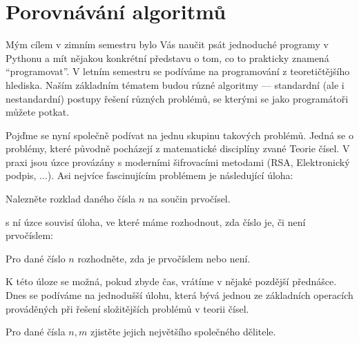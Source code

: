 \ifx\ucebnice\undefined

\setcounter{section}{0}
\else
\renewcommand{\section}[1]{\chapter{#1}}
\fi
\section{Porovnávání algoritmů}

Mým cílem v zimním semestru bylo Vás naučit psát jednoduché programy v Pythonu a mít nějakou konkrétní představu o tom,
co to prakticky znamená ``programovat''. V letním semestru se podíváme na programování z teoretičtějšího hlediska.
Naším základním tématem budou různé algoritmy --- standardní (ale i nestandardní) postupy řešení různých problémů,
se kterými se jako programátoři můžete potkat.

Pojďme se nyní společně podívat na jednu skupinu takových problémů. Jedná se o problémy, které původně pocházejí z
matematické disciplíny zvané Teorie čísel. V praxi jsou úzce provázány s moderními šifrovacími metodami
(RSA, Elektronický podpis, ...). Asi nejvíce fascinujícím problémem je následující úloha:

\begin{uloha}
Nalezněte rozklad daného čísla $n$ na součin prvočísel.
\end{uloha}

s ní úzce souvisí úloha, ve které máme rozhodnout, zda číslo je, či není prvočíslem:

\begin{uloha}
Pro dané číslo $n$ rozhodněte, zda je prvočíslem nebo není.
\end{uloha}

K této úloze se možná, pokud zbyde čas, vrátíme v nějaké pozdější přednášce. Dnes se podíváme na jednodušší úlohu, která
bývá jednou ze základních operacích prováděných při řešení složitějších problémů v teorii čísel.

\begin{uloha}
Pro dané čísla $n,m$ zjistěte jejich největšího společného dělitele.
\end{uloha}


